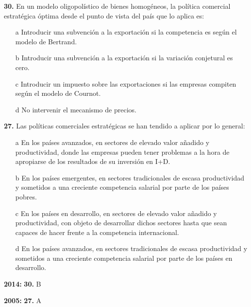 \documentclass{nuevotema}
\begin{document}
\preguntas


\textbf{30.} En un modelo oligopolístico de bienes homogéneos, la política comercial estratégica óptima desde el punto de vista del país que lo aplica es:
\begin{itemize}
	\item[a] Introducir una subvención a la exportación si la competencia es según el modelo de Bertrand.
	\item[b] Introducir una subvención a la exportación si la variación conjetural es cero.
	\item[c] Introducir un impuesto sobre las exportaciones si las empresas compiten según el modelo de Cournot.
	\item[d] No intervenir el mecanismo de precios.
\end{itemize}


\textbf{27.} Las políticas comerciales estratégicas se han tendido a aplicar por lo general:
\begin{itemize}
	\item[a] En los países avanzados, en sectores de elevado valor añadido y productividad, donde las empresas pueden tener problemas a la hora de apropiarse de los resultados de su inversión en I+D.
	\item[b] En los países emergentes, en sectores tradicionales de escasa productividad y sometidos a una creciente competencia salarial por parte de los países pobres.
	\item[c] En los países en desarrollo, en sectores de elevado valor añadido y productividad, con objeto de desarrollar dichos sectores hasta que sean capaces de hacer frente a la competencia internacional.
	\item[d] En los países avanzados, en sectores tradicionales de escasa productividad y sometidos a una creciente competencia salarial por parte de los países en desarrollo.
\end{itemize}

\notas

\textbf{2014:} \textbf{30.} B

\textbf{2005:} \textbf{27.} A

\bibliografia
\end{document}
